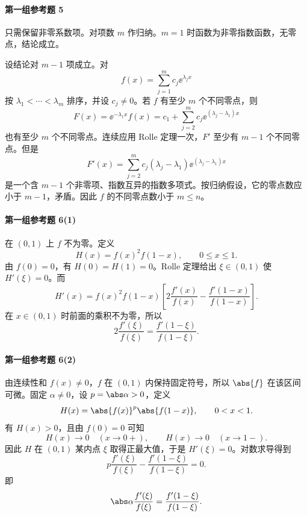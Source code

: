 \paragraph{第一组参考题 5}
\begin{xsolution}
只需保留非零系数项。对项数 $m$ 作归纳。$m=1$ 时函数为非零指数函数，无零点，结论成立。

设结论对 $m-1$ 项成立。对
\[
  f(x)=\sum_{j=1}^m c_j\ee^{\lambda_jx}
\]
按 $\lambda_1<\cdots<\lambda_m$ 排序，并设 $c_j\neq0$。若 $f$ 有至少 $m$ 个不同零点，则
\[
  F(x)=\ee^{-\lambda_1x}f(x)
  =c_1+\sum_{j=2}^m c_j\ee^{(\lambda_j-\lambda_1)x}
\]
也有至少 $m$ 个不同零点。连续应用 Rolle 定理一次，$F'$ 至少有 $m-1$ 个不同零点。但是
\[
  F'(x)=\sum_{j=2}^m c_j(\lambda_j-\lambda_1)
  \ee^{(\lambda_j-\lambda_1)x}
\]
是一个含 $m-1$ 个非零项、指数互异的指数多项式。按归纳假设，它的零点数应小于 $m-1$，矛盾。因此 $f$ 的不同零点数小于 $m\leqslant n$。
\end{xsolution}

\paragraph{第一组参考题 6(1)}
\begin{xsolution}
在 $(0,1)$ 上 $f$ 不为零。定义
\[
  H(x)=f(x)^2f(1-x),\qquad0\leqslant x\leqslant1.
\]
由 $f(0)=0$，有 $H(0)=H(1)=0$。Rolle 定理给出 $\xi\in(0,1)$ 使 $H'(\xi)=0$。而
\[
  H'(x)=f(x)^2f(1-x)
  \left[2\frac{f'(x)}{f(x)}-
  \frac{f'(1-x)}{f(1-x)}\right].
\]
在 $x\in(0,1)$ 时前面的乘积不为零，所以
\[
  2\frac{f'(\xi)}{f(\xi)}
  =\frac{f'(1-\xi)}{f(1-\xi)}.
\]
\end{xsolution}

\paragraph{第一组参考题 6(2)}
\begin{xsolution}
由连续性和 $f(x)\neq0$，$f$ 在 $(0,1)$ 内保持固定符号，所以 $\abs{f}$ 在该区间可微。固定 $\alpha\neq0$，设 $p=\abs\alpha>0$，定义
\[
  H(x)=\abs{f(x)}^p\abs{f(1-x)},\qquad0<x<1.
\]
有 $H(x)>0$，且由 $f(0)=0$ 可知
\[
  H(x)\to0\quad(x\to0+),
  \qquad
  H(x)\to0\quad(x\to1-).
\]
因此 $H$ 在 $(0,1)$ 某内点 $\xi$ 取得正最大值，于是 $H'(\xi)=0$。对数求导得到
\[
  p\frac{f'(\xi)}{f(\xi)}
  -\frac{f'(1-\xi)}{f(1-\xi)}=0.
\]
即
\[
  \abs\alpha\frac{f'(\xi)}{f(\xi)}
  =\frac{f'(1-\xi)}{f(1-\xi)}.
\]
\end{xsolution}


